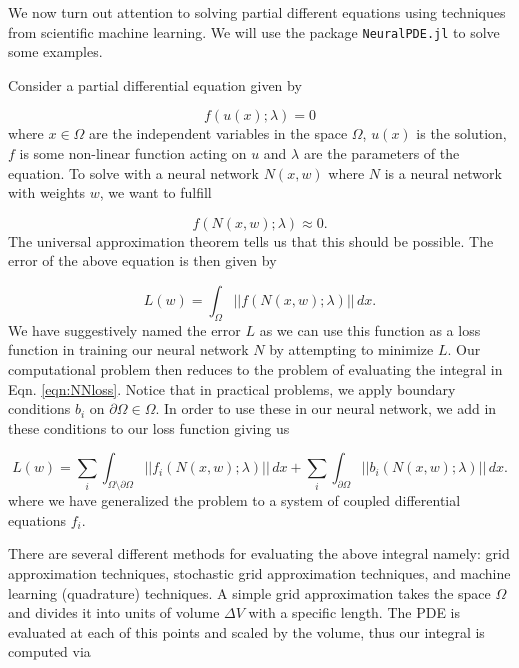 \documentclass{CUP-JNL-DTM}%
\theoremstyle{definition}
\numberwithin{equation}{section}
\begin{document}
We now turn out attention to solving partial different equations using techniques from scientific machine learning. We will use the package \texttt{NeuralPDE.jl} \cite{zubovNeuralPDEAutomatingPhysicsInformed2021} to solve some examples. 

Consider a partial differential equation given by 

\begin{equation}
	f(u(x); \lambda) = 0
\end{equation}
where $x \in \Omega$ are the independent variables in the space $\Omega$, $u(x)$ is the solution, $f$ is some non-linear function acting on $u$ and $\lambda$ are the parameters of the equation. To solve with a neural network $N(x, w)$ where $N$ is a neural network with weights $w$, we want to fulfill 

\begin{equation}
	f(N(x, w); \lambda) \approx 0.
	\label{eqn:NNapprox}
\end{equation}
The universal approximation theorem tells us that this should be possible. The error of the above equation is then given by 

\begin{equation}
	L(w) = \int_{\Omega} ||f(N(x,w); \lambda)||\,dx. 
	\label{eqn:NNloss}
\end{equation}
We have suggestively named the error $L$ as we can use this function as a loss function in training our neural network $N$ by attempting to minimize $L$. Our computational problem then reduces to the problem of evaluating the integral in Eqn. \ref{eqn:NNloss}. Notice that in practical problems, we apply boundary conditions $b_i$ on $\partial \Omega \in \Omega$. In order to use these in our neural network, we add in these conditions to our loss function giving us 

\begin{equation}
	L(w) = \sum_i\int_{\Omega\setminus\partial\Omega} ||f_i(N(x,w); \lambda)||\,dx + \sum_i\int_{\partial\Omega} ||b_i(N(x,w); \lambda)||\,dx.
	\label{eqn:complete_loss} 
\end{equation}
where we have generalized the problem to a system of coupled differential equations $f_i$. 

There are several different methods for evaluating the above integral namely: grid approximation techniques, stochastic grid approximation techniques, and machine learning (quadrature) techniques. A simple grid approximation takes the space $\Omega$ and divides it into units of volume $\Delta V$ with a specific length. The PDE is evaluated at each of this points and scaled by the volume, thus our integral is computed via 
\end{document}
